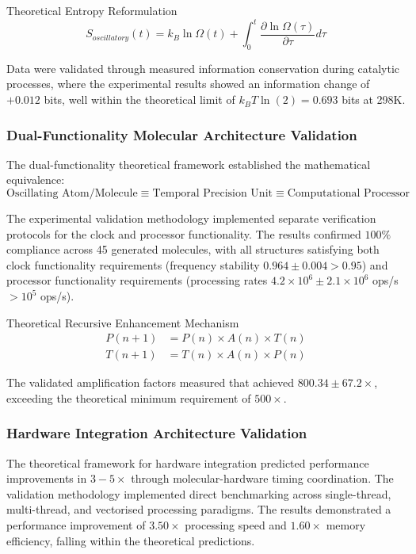 \documentclass[12pt,a4paper]{article}
\begin{document}
Theoretical Entropy Reformulation
\begin{equation}
S_{oscillatory}(t) = k_B \ln \Omega(t) + \int_0^t \frac{\partial \ln \Omega(\tau)}{\partial \tau} d\tau
\end{equation}

Data were validated through measured information conservation during catalytic processes, where the experimental results showed an information change of $+0.012$ bits, well within the theoretical limit of $k_B T \ln(2) = 0.693$ bits at 298K.

\subsubsection{Dual-Functionality Molecular Architecture Validation}

The dual-functionality theoretical framework established the mathematical equivalence:
\begin{equation}
\text{Oscillating Atom/Molecule} \equiv \text{Temporal Precision Unit} \equiv \text{Computational Processor}
\end{equation}

The experimental validation methodology implemented separate verification protocols for the clock and processor functionality. The results confirmed $100\%$ compliance across 45 generated molecules, with all structures satisfying both clock functionality requirements (frequency stability $0.964 \pm 0.004 > 0.95$) and processor functionality requirements (processing rates $4.2 \times 10^6 \pm 2.1 \times 10^6$ ops/s $> 10^5$ ops/s).

Theoretical Recursive Enhancement Mechanism
\begin{align}
P(n+1) &= P(n) \times A(n) \times T(n) \\
T(n+1) &= T(n) \times A(n) \times P(n)
\end{align}

The validated amplification factors measured that achieved $800.34 \pm 67.2 \times$, exceeding the theoretical minimum requirement of $500 \times$.

\subsubsection{Hardware Integration Architecture Validation}

The theoretical framework for hardware integration predicted performance improvements in $3-5 \times$ through molecular-hardware timing coordination. The validation methodology implemented direct benchmarking across single-thread, multi-thread, and vectorised processing paradigms. The results demonstrated a performance improvement of $3.50 \times$ processing speed and $1.60 \times$ memory efficiency, falling within the theoretical predictions.
\end{document}
